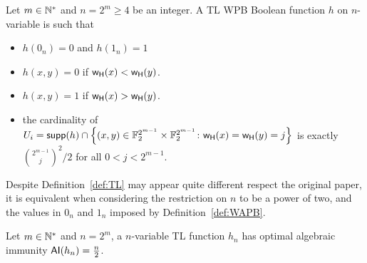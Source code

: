 \documentclass[11pt]{llncs}
\begin{document}
\begin{definition}\label{def:TL}
	Let $m \in \mathbb{N}^*$ and $n = 2^m \ge 4$ be an integer. A TL WPB Boolean function $h$ on $n$-variable is such that
	\begin{itemize}
		\item $h(0_n)=0$ and $h(1_n)=1$ 
		\item $h(x,y)=0$ if $\mathsf{w_H}(x)<\mathsf{w_H}(y)$.
		\item $h(x,y)=1$ if $\mathsf{w_H}(x)>\mathsf{w_H}(y)$.
		\item the cardinality of $U_i=\mathsf{supp}(h)\cap\left\{(x,y)\in\mathbb{F}_2^{2^{m-1}}\times \mathbb{F}_2^{2^{m-1}}\colon \mathsf{w_H}(x)=\mathsf{w_H}(y)=j\right\}$ is exactly $\binom{2^{m-1}}{j}^2/2$ for all $0<j<2^{m-1}$.
	\end{itemize}	
\end{definition}
\begin{remark}
	Despite Definition~\ref{def:TL} may appear quite different respect the original paper, it is equivalent when considering the restriction on $n$ to be a power of two, and the values in $0_n$ and $1_n$ imposed by Definition~\ref{def:WAPB}. 
\end{remark}

\begin{Prop}\label{Prop:TL}
	Let $m \in \mathbb{N}^*$ and $n=2^m$, a  $n$-variable TL function $h_n$ has optimal algebraic immunity $\mathsf{AI}(h_n)=\frac{n}{2}$.
\end{Prop}
\end{document}
